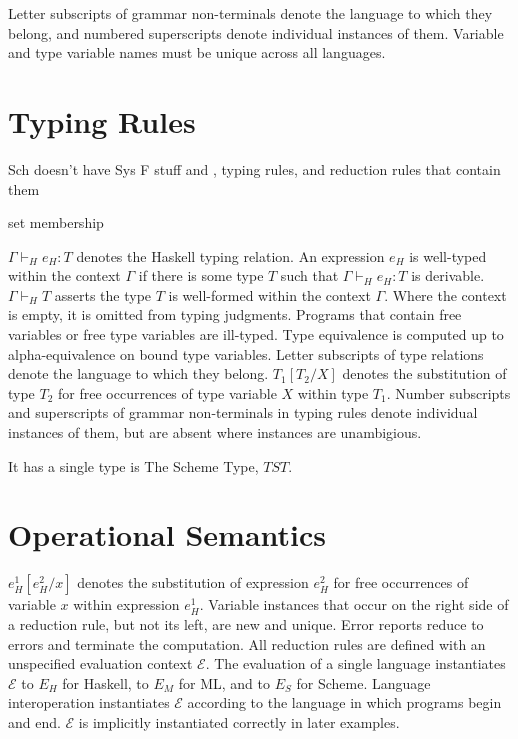 Letter subscripts of grammar non-terminals denote the language to which they belong, and numbered superscripts denote individual instances of them.  Variable and type variable names must be unique across all languages.

\section{Typing Rules}

Sch doesn't have Sys F stuff and , typing rules, and reduction rules that contain them

set membership

$\Gamma\vdash_{H}e_{H}:T$ denotes the Haskell typing relation.  An expression $e_{H}$ is well-typed within the context $\Gamma$ if there is some type $T$ such that $\Gamma\vdash_{H}e_{H}:T$ is derivable.  $\Gamma\vdash_{H}T$ asserts the type $T$ is well-formed within the context $\Gamma$.  Where the context is empty, it is omitted from typing judgments.  Programs that contain free variables or free type variables are ill-typed.  Type equivalence is computed up to alpha-equivalence on bound type variables.  Letter subscripts of type relations denote the language to which they belong.  $T_{1}[T_{2}/X]$ denotes the substitution of type $T_{2}$ for free occurrences of type variable $X$ within type $T_{1}$.  Number subscripts and superscripts of grammar non-terminals in typing rules denote individual instances of them, but are absent where instances are unambigious.

It has a single type is The Scheme Type, $TST$.  

\section{Operational Semantics}

$e_{H}^{1}[e_{H}^{2}/x]$ denotes the substitution of expression $e_{H}^{2}$ for free occurrences of variable $x$ within expression $e_{H}^{1}$.  Variable instances that occur on the right side of a reduction rule, but not its left, are new and unique.  Error reports reduce to errors and terminate the computation.  All reduction rules are defined with an unspecified evaluation context $\mathscr{E}$.  The evaluation of a single language instantiates $\mathscr{E}$ to $E_{H}$ for Haskell, to $E_{M}$ for ML, and to $E_{S}$ for Scheme.  Language interoperation instantiates $\mathscr{E}$ according to the language in which programs begin and end.  $\mathscr{E}$ is implicitly instantiated correctly in later examples.

